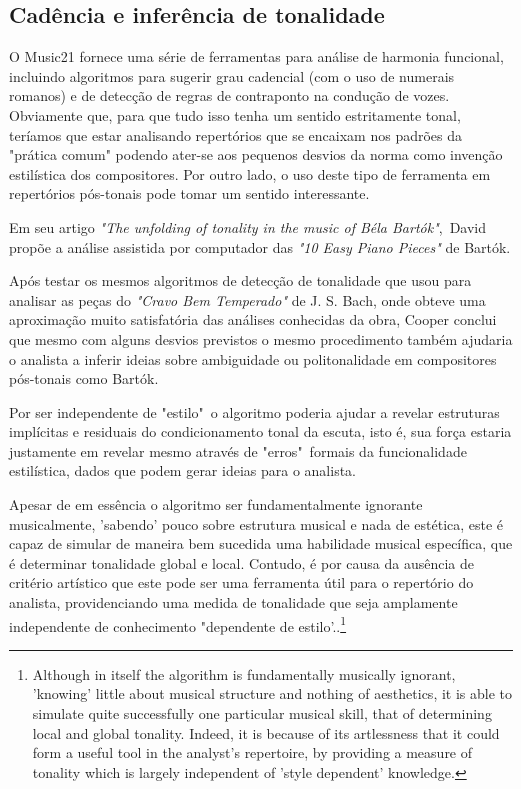 \documentclass[
	12pt,				%
	openright,			%
	twoside,			%
	a4paper,			%
	english,			%
	french,				%
	spanish,			%
	brazil				%
	]{abntex2}
\begin{document}
\subsection{Cadência e inferência de tonalidade}


O Music21 fornece uma série de ferramentas para análise de harmonia funcional, incluindo algoritmos para sugerir grau cadencial (com o uso de numerais romanos) e de detecção de regras de contraponto na condução de vozes. Obviamente que, para que tudo isso tenha um sentido estritamente tonal, teríamos que estar analisando repertórios que se encaixam nos padrões da "prática comum" \cite[p. 354]{temperley2001cognition} podendo ater-se aos pequenos desvios da norma como invenção estilística dos compositores. Por outro lado, o uso deste tipo de ferramenta em repertórios pós-tonais pode tomar um sentido interessante. 

Em seu artigo \textit{"The unfolding of tonality in the music of Béla Bartók"},\ David  propõe a análise assistida por computador das \textit{"10 Easy Piano Pieces"} de Bartók. 

Após testar os mesmos algoritmos de detecção de tonalidade que usou para analisar as peças do \textit{"Cravo Bem Temperado"} de J. S. Bach, onde obteve uma aproximação muito satisfatória das análises conhecidas da obra, Cooper conclui que mesmo com alguns desvios previstos o mesmo procedimento também ajudaria o analista a inferir ideias sobre ambiguidade ou politonalidade em compositores pós-tonais como Bartók.

Por ser independente de "estilo"\ o algoritmo poderia ajudar a revelar estruturas implícitas e residuais do condicionamento tonal da escuta, isto é, sua força estaria justamente em revelar mesmo através de "erros"\ formais da funcionalidade estilística, dados que podem gerar ideias para o analista.

\begin{citacao}
Apesar de em essência o algoritmo ser fundamentalmente ignorante musicalmente, 'sabendo' pouco sobre estrutura musical e nada de estética, este é capaz de simular de maneira bem sucedida uma habilidade musical específica, que é determinar tonalidade global e local. Contudo, é por causa da ausência de critério artístico que este pode ser uma ferramenta útil para o repertório do analista, providenciando uma medida de tonalidade que seja amplamente independente de conhecimento "dependente de estilo'.\cite[p. 34-35]{cooper1998unfolding}.\footnote{Although in itself the algorithm is fundamentally musically ignorant, 'knowing' little about musical structure and nothing of aesthetics, it is able to simulate quite successfully one particular musical skill, that of determining local and global tonality. Indeed, it is because of its artlessness that it could form a useful tool in the analyst's repertoire, by providing a measure of tonality which is largely independent of 'style dependent' knowledge.\cite[p. 34-35]{cooper1998unfolding}}
\end{citacao}
\end{document}
